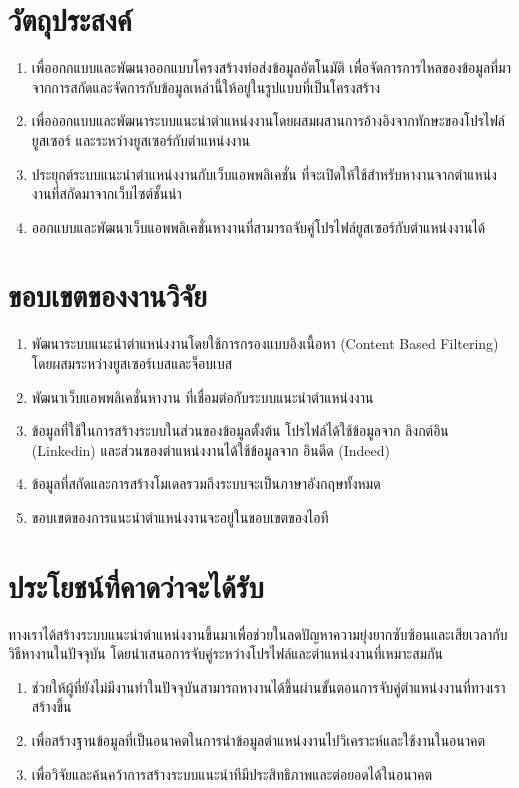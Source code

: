 \section{วัตถุประสงค์}
\begin{enumerate}
  \item เพื่ออกกแบบและพัฒนาออกแบบโครงสร้างท่อส่งข้อมูลอัตโนมัติ เพื่อจัดการการไหลของข้อมูลที่มาจากการสกัดและจัดการกับข้อมูลเหล่านี้ให้อยู่ในรูปแบบที่เป็นโครงสร้าง
  \item เพื่อออกแบบและพัฒนาระบบแนะนำตำแหน่งงานโดยผสมผสานการอ้างอิงจากทักษะของโปรไฟล์ยูสเซอร์ และระหว่างยูสเซอร์กับตำแหน่งงาน
  \item ประยุกต์ระบบแนะนำตำแหน่งงานกับเว็บแอพพลิเคชั่น ที่จะเปิดให้ใช้สำหรับหางานจากตำแหน่งงานที่สกัดมาจากเว็บไซต์ชั้นนำ
  \item ออกแบบและพัฒนาเว็บแอพพลิเคชั่นหางานที่สามารถจับคู่โปรไฟล์ยูสเซอร์กับตำแหน่งงานได้
\end{enumerate}

\section{ขอบเขตของงานวิจัย}
\begin{enumerate}
    \item พัฒนาระบบแนะนำตำแหน่งงานโดยใช้การกรองแบบอิงเนื้อหา (Content Based Filtering) โดยผสมระหว่างยูสเซอร์เบสและจ็อบเบส
    \item พัฒนาเว็บแอพพลิเคชั่นหางาน ที่เชื่อมต่อกับระบบแนะนำตำแหน่งงาน
    \item ข้อมูลที่ใช้ในการสร้างระบบในส่วนของข้อมูลตั้งต้น โปรไฟล์ได้ใช้ข้อมูลจาก ลิงกต์อิน (Linkedin) และส่วนของตำแหน่งงานได้ใช้ข้อมูลจาก อินดีด (Indeed)
    \item ข้อมูลที่สกัดและการสร้างโมเดลรวมถึงระบบจะเป็นภาษาอังกฤษทั้งหมด
    \item ขอบเขตของการแนะนำตำแหน่งงานจะอยู่ในขอบเขตของไอที
\end{enumerate}

\section{ประโยชน์ที่คาดว่าจะได้รับ}
ทางเราได้สร้างระบบแนะนำตำแหน่งงานขึ้นมาเพื่อช่วยในลดปัญหาความยุ่งยากซับซ้อนและเสียเวลากับวิธีหางานในปัจจุบัน โดยนำเสนอการจับคู่ระหว่างโปรไฟล์และตำแหน่งงานที่เหมาะสมกัน
\begin{enumerate}
  \item ช่วยให้ผู้ที่ยังไม่มีงานทำในปัจจุบันสามารถหางานได้ขึ้นผ่านขั้นตอนการจับคู่ตำแหน่งงานที่ทางเราสร้างขึ้น
  \item เพื่อสร้างฐานข้อมูลที่เป็นอนาคตในการนำข้อมูลตำแหน่งงานไปวิเคราะห์และใช้งานในอนาคต
  \item เพื่อวิจัยและค้นคว้าการสร้างระบบแนะนำทีมีประสิทธิภาพและต่อยอดได้ในอนาคต
\end{enumerate}


